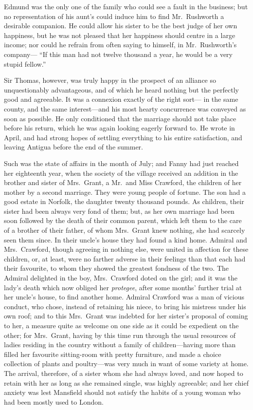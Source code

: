 \documentclass{article}
\begin{document}
Edmund was the only one of the family who could see a fault
in the business; but no representation of his aunt's could
induce him to find Mr.\ Rushworth a desirable companion.
He could allow his sister to be the best judge of her
own happiness, but he was not pleased that her happiness
should centre in a large income; nor could he refrain
from often saying to himself, in Mr.\ Rushworth's company---%
``If this man had not twelve thousand a year, he would be
a very stupid fellow.''

Sir Thomas, however, was truly happy in the prospect of an
alliance so unquestionably advantageous, and of which he
heard nothing but the perfectly good and agreeable.
It was a connexion exactly of the right sort---%
in the same county, and the same interest---and his most
hearty concurrence was conveyed as soon as possible.
He only conditioned that the marriage should not take
place before his return, which he was again looking
eagerly forward to.  He wrote in April, and had strong
hopes of settling everything to his entire satisfaction,
and leaving Antigua before the end of the summer.

Such was the state of affairs in the month of July;
and Fanny had just reached her eighteenth year, when the
society of the village received an addition in the brother
and sister of Mrs.\ Grant, a Mr.\ and Miss Crawford,
the children of her mother by a second marriage.
They were young people of fortune.  The son had a good
estate in Norfolk, the daughter twenty thousand pounds.
As children, their sister had been always very fond
of them; but, as her own marriage had been soon followed
by the death of their common parent, which left them
to the care of a brother of their father, of whom
Mrs.\ Grant knew nothing, she had scarcely seen them since.
In their uncle's house they had found a kind home.
Admiral and Mrs.\ Crawford, though agreeing in nothing else,
were united in affection for these children, or, at least,
were no farther adverse in their feelings than that each
had their favourite, to whom they showed the greatest
fondness of the two.  The Admiral delighted in the boy,
Mrs.\ Crawford doted on the girl; and it was the lady's
death which now obliged her \emph{protegee}, after some months'
further trial at her uncle's house, to find another home.
Admiral Crawford was a man of vicious conduct, who chose,
instead of retaining his niece, to bring his mistress
under his own roof; and to this Mrs.\ Grant was indebted
for her sister's proposal of coming to her, a measure quite
as welcome on one side as it could be expedient on the other;
for Mrs.\ Grant, having by this time run through the usual
resources of ladies residing in the country without a
family of children---having more than filled her favourite
sitting-room with pretty furniture, and made a choice
collection of plants and poultry---was very much in want
of some variety at home.  The arrival, therefore, of a sister
whom she had always loved, and now hoped to retain with
her as long as she remained single, was highly agreeable;
and her chief anxiety was lest Mansfield should not satisfy
the habits of a young woman who had been mostly used
to London.
\end{document}
